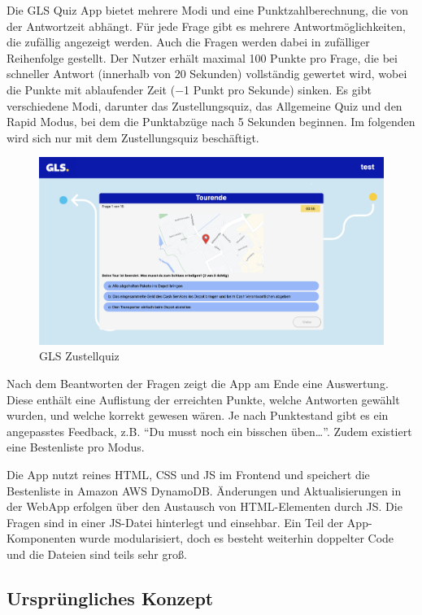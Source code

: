 \documentclass[biblatex]{lni}
\begin{document}
Die GLS Quiz App bietet mehrere Modi und eine Punktzahlberechnung,
die von der Antwortzeit abhängt. \cite{GLSQ}
Für jede Frage gibt es mehrere Antwortmöglichkeiten,
die zufällig angezeigt werden.
Auch die Fragen werden dabei in zufälliger Reihenfolge gestellt.
Der Nutzer erhält maximal 100 Punkte pro Frage,
die bei schneller Antwort (innerhalb von 20 Sekunden) vollständig gewertet wird,
wobei die Punkte mit ablaufender Zeit (−1 Punkt pro Sekunde) sinken.
Es gibt verschiedene Modi, darunter das Zustellungsquiz,
das Allgemeine Quiz und den Rapid Modus, bei dem die Punktabzüge nach 5 Sekunden beginnen.
Im folgenden wird sich nur mit dem Zustellungsquiz beschäftigt.

\begin{figure}
  \centering
  \includegraphics[width=.8\textwidth]{gls-trainee}
  \caption{GLS Zustellquiz}
  \label{fig:gls-trainee}
\end{figure}

Nach dem Beantworten der Fragen zeigt die App am Ende eine Auswertung.
Diese enthält eine Auflistung der erreichten Punkte, welche Antworten gewählt wurden, und welche korrekt gewesen wären.
Je nach Punktestand gibt es ein angepasstes Feedback, z.B. “Du musst noch ein bisschen üben…”.
Zudem existiert eine Bestenliste pro Modus.

Die App nutzt reines \ac{HTML}, \ac{CSS} und \ac{JS} im Frontend und speichert die Bestenliste in Amazon AWS DynamoDB. \cite{GLSQS}
Änderungen und Aktualisierungen in der \ac{WebApp} erfolgen über den Austausch von \ac{HTML}-Elementen durch \ac{JS}.
Die Fragen sind in einer \ac{JS}-Datei hinterlegt und einsehbar.
Ein Teil der App-Komponenten wurde modularisiert,
doch es besteht weiterhin doppelter Code und die Dateien sind teils sehr groß.

\subsection{Ursprüngliches Konzept}
\end{document}
